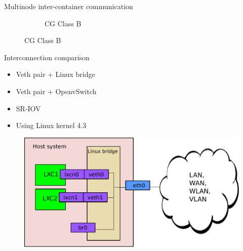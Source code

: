\documentclass[11pt,xcolor=dvipsnames,presentation]{beamer}
\begin{document}
\begin{frame}[label=sec-3-0-9]{Multinode inter-container communication}
\begin{figure}
\begin{subfigure}[b]{0.42\textwidth}
    \caption{CG Class B}
  \end{subfigure}
\end{figure}
\end{frame}

\begin{frame}[label=sec-3-0-10]{Interconnection comparison}
\begin{itemize}
\item \alert{Veth pair + Linux bridge}
\item \alert{Veth pair + OpenvSwitch}
\item \alert{SR-IOV}
\item Using Linux kernel 4.3
\end{itemize}

\begin{figure}[!h]
  \center
  \includegraphics[scale=0.4]{figures/lxc-veth.pdf}
  \label{fig:hpc}
\end{figure}
\end{frame}
\end{document}
